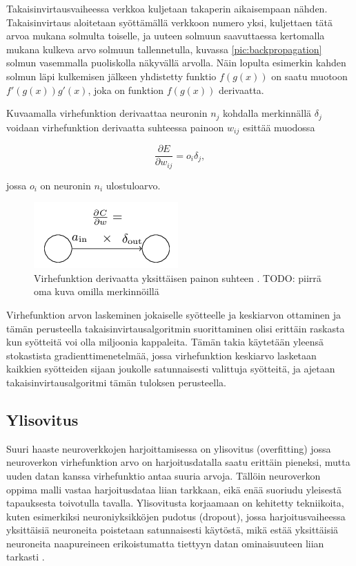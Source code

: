 \documentclass[finnish]{tktltiki2}
\theoremstyle{definition}
\theoremstyle{remark}
\begin{document}
  Takaisinvirtausvaiheessa verkkoa kuljetaan takaperin aikaisempaan nähden. Takaisinvirtaus aloitetaan syöttämällä verkkoon numero yksi, kuljettaen tätä arvoa mukana solmulta toiselle, ja uuteen solmuun saavuttaessa kertomalla mukana kulkeva arvo solmuun tallennetulla, kuvassa \ref{pic:backpropagation} solmun vasemmalla puoliskolla näkyvällä arvolla. Näin lopulta esimerkin kahden solmun läpi kulkemisen jälkeen yhdistetty funktio $f(g(x))$ on saatu muotoon $f'(g(x))g'(x)$, joka on funktion $f(g(x))$ derivaatta. 

  Kuvaamalla virhefunktion derivaattaa neuronin $n_j$ kohdalla merkinnällä $\delta_j$ voidaan virhefunktion derivaatta suhteessa painoon $w_{ij}$ esittää muodossa 

    $$ \frac{\partial E}{\partial w_{ij}} = o_i\delta_j,$$

  jossa $o_i$ on neuronin $n_i$ ulostuloarvo.

  \begin{figure}[h]
    \centering
    \includegraphics[scale=0.8]{cost-derivative}
    \caption{Virhefunktion derivaatta yksittäisen painon suhteen \cite{Nielsen-neural}. TODO: piirrä oma kuva omilla merkinnöillä}
    \label{pic:cost-weight-derivative}
  \end{figure}

  Virhefunktion arvon laskeminen jokaiselle syötteelle ja keskiarvon ottaminen ja tämän perusteella takaisinvirtausalgoritmin suorittaminen olisi erittäin raskasta kun syötteitä voi olla miljoonia kappaleita. Tämän takia käytetään yleensä stokastista gradienttimenetelmää, jossa virhefunktion keskiarvo lasketaan kaikkien syötteiden sijaan joukolle satunnaisesti valittuja syötteitä, ja ajetaan takaisinvirtausalgoritmi tämän tuloksen perusteella.

  \subsection{Ylisovitus}

  Suuri haaste neuroverkkojen harjoittamisessa on ylisovitus (overfitting) jossa neuroverkon virhefunktion arvo on harjoitusdatalla saatu erittäin pieneksi, mutta uuden datan kanssa virhefunktio antaa suuria arvoja. Tällöin neuroverkon oppima malli vastaa harjoitusdataa liian tarkkaan, eikä enää suoriudu yleisestä tapauksesta toivotulla tavalla. Ylisovitusta korjaamaan on kehitetty tekniikoita, kuten esimerkiksi neuroniyksikköjen pudotus (dropout), jossa harjoitusvaiheessa yksittäisiä neuroneita poistetaan satunnaisesti käytöstä, mikä estää yksittäisiä neuroneita naapureineen erikoistumatta tiettyyn datan ominaisuuteen liian tarkasti \cite{dropout-srivastava}.
% 
\end{document}
